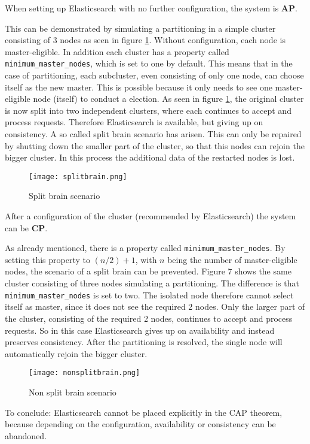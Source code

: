 When setting up Elasticsearch with no further configuration, the system is \textbf{AP}. 

This can be demonstrated by simulating a partitioning in a simple cluster consisting of 3 nodes as seen in figure \ref{fig:splitbrain}. Without configuration, each node is master-eligible. In addition each cluster has a property called \texttt{minimum\_master\_nodes}, which is set to one by default. This means that in the case of partitioning, each subcluster, even consisting of only one node, can choose itself as the new master. This is possible because it only needs to see one master-eligible node (itself) to conduct a election. As seen in figure \ref{fig:splitbrain}, the original cluster is now split into two independent clusters, where each continues to accept and process requests. Therefore Elasticsearch is available, but giving up on consistency. A so called split brain scenario has arisen. This can only be repaired by shutting down the smaller part of the cluster, so that this nodes can rejoin the bigger cluster. In this process the additional data of the restarted nodes is lost.

\begin{figure}[ht]
    \centering
    \texttt{[image: splitbrain.png]}
    \caption{Split brain scenario \autocite{nathanir2019}}
    \label{fig:splitbrain}
\end{figure}

After a configuration of the cluster (recommended by Elasticsearch) the system can be \textbf{CP}.

As already mentioned, there is a property called \texttt{minimum\_master\_nodes}. By setting this property to $(n/2)+1$, with $n$ being the number of master-eligible nodes, the scenario of a split brain can be prevented. Figure 7 shows the same cluster consisting of three nodes simulating a partitioning. The difference is that \texttt{minimum\_master\_nodes} is set to two. The isolated node therefore cannot select itself as master, since it does not see the required 2 nodes. Only the larger part of the cluster, consisting of the required 2 nodes, continues to accept and process requests. So in this case Elasticsearch gives up on availability and instead preserves consistency. After the partitioning is resolved, the single node will automatically rejoin the bigger cluster.

\begin{figure}[ht]
    \centering
    \texttt{[image: nonsplitbrain.png]}
    \caption{Non split brain scenario \autocite{nathanir2019}}
    \label{fig:nonsplitbrain}
\end{figure}

To conclude: Elasticsearch cannot be placed explicitly in the CAP theorem, because depending on the configuration, availability or consistency can be abandoned.
